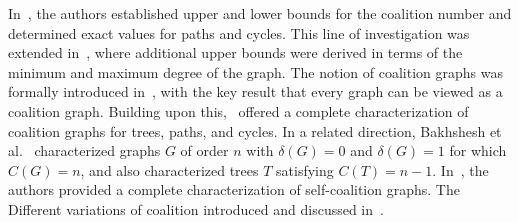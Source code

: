 \documentclass[12pt]{article}
\begin{document}
    In~\cite{haynes2020introduction}, the authors established upper and lower bounds for the coalition number and determined exact values for paths and cycles. This line of investigation was extended in~\cite{haynes2021upper}, where additional upper bounds were derived in terms of the minimum and maximum degree of the graph. The notion of coalition graphs was formally introduced in~\cite{haynes2023coalition}, with the key result that every graph can be viewed as a coalition graph. Building upon this,~\cite{haynes2023coalition1} offered a complete characterization of coalition graphs for trees, paths, and cycles.  In a related direction, Bakhshesh et al.~\cite{bakhshesh2023coalition} characterized graphs $G$ of order $n$ with $\delta(G) = 0$ and $\delta(G) = 1$ for which $C(G) = n$, and also characterized trees $T$ satisfying $C(T) = n - 1$. In~\cite{haynes2023self}, the authors provided a complete characterization of self-coalition graphs. The Different variations of coalition introduced and discussed in~\cite{alikhani2024total,alikhani2025independent,henning2025double,samadzadeh2025paired,bakhshesh2025minmin}.
\end{document}
